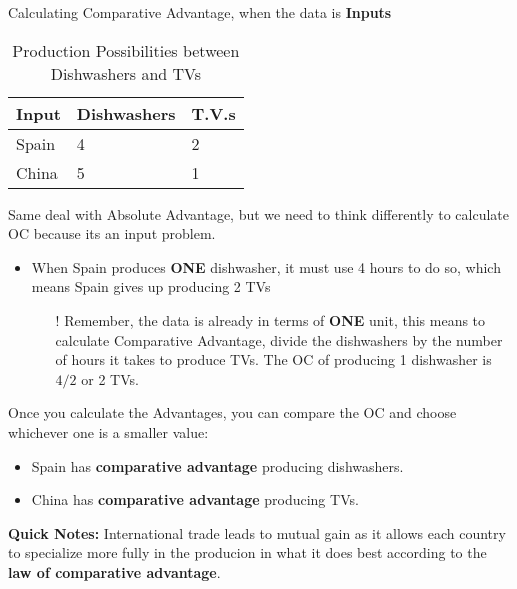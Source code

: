 \begin{example}
    Calculating Comparative Advantage, when the data is \textbf{Inputs}
    \begin{table}[h!]
        \begin{center}
            \begin{tabular}{l|l|l}
                \toprule
                \textbf{Input} & \textbf{Dishwashers} & \textbf{T.V.s}\\
                \midrule
                Spain & 4 & 2\\
                China & 5 & 1\\
                \bottomrule
            \end{tabular}
        \end{center}
        \caption{Production Possibilities between Dishwashers and TVs}
        \label{tab:table5}
    \end{table}

Same deal with Absolute Advantage, but we need to think differently to calculate OC because its an input problem.
\begin{itemize}
    \item When Spain produces \textbf{ONE} dishwasher, it must use 4 hours to do so, which means Spain gives up producing 2 TVs
        \begin{itemize}
            \item[!] Remember, the data is already in terms of \textbf{ONE} unit, this means to calculate Comparative Advantage, divide the dishwashers by the number of hours it takes to produce TVs. The OC of producing 1 dishwasher is $4/2$ or 2 TVs.
        \end{itemize}
\end{itemize}

Once you calculate the Advantages, you can compare the OC and choose whichever one is a smaller value:
\begin{itemize}
    \item Spain has \textbf{comparative advantage} producing dishwashers. 
    \item China has \textbf{comparative advantage} producing TVs.
\end{itemize}
\end{example}

\textbf{Quick Notes:}
International trade leads to mutual gain as it allows each country to specialize more fully in the producion in what it does best according to the \textbf{law of comparative advantage}.

